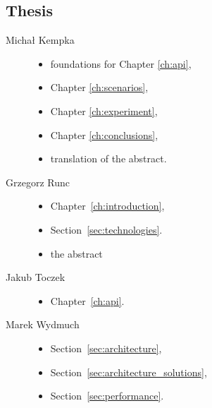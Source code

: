 	\subsection{Thesis}
	\begin{description}
		\item[Michał Kempka] \hfill
			\begin{itemize}
				\item foundations for Chapter \ref{ch:api},
				\item Chapter \ref{ch:scenarios},
				\item Chapter \ref{ch:experiment},
				\item Chapter \ref{ch:conclusions},
				\item translation of the abstract.
			\end{itemize}
		\item[Grzegorz Runc] \hfill
			\begin{itemize}
				\item Chapter~\ref{ch:introduction},
				\item Section~\ref{sec:technologies}.
                \item the abstract
			\end{itemize}
		\item[Jakub Toczek] \hfill
			\begin{itemize}
				\item Chapter~\ref{ch:api}.
			\end{itemize}
		\item[Marek Wydmuch] \hfill
			\begin{itemize}
				\item Section~\ref{sec:architecture},
				\item Section~\ref{sec:architecture_solutions},
				\item Section~\ref{sec:performance}.
			\end{itemize}
	\end{description}

